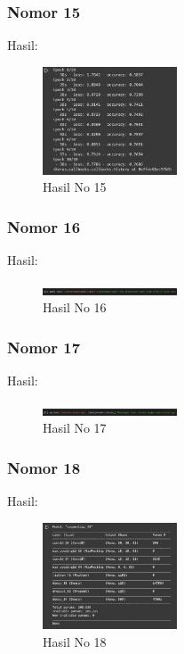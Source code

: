 \subsubsection{Nomor 15}
\hfill\break

Hasil:
\begin{figure}[H]
\centering
	\includegraphics[width=4cm]{figures/1174067/7/no15.jpg}
	\caption{Hasil No 15}
\end{figure}

\subsubsection{Nomor 16}
\hfill\break

Hasil:
\begin{figure}[H]
\centering
	\includegraphics[width=4cm]{figures/1174067/7/no16.jpg}
	\caption{Hasil No 16}
\end{figure}

\subsubsection{Nomor 17}
\hfill\break

Hasil:
\begin{figure}[H]
\centering
	\includegraphics[width=4cm]{figures/1174067/7/no17.jpg}
	\caption{Hasil No 17}
\end{figure}

\subsubsection{Nomor 18}
\hfill\break

Hasil:
\begin{figure}[H]
\centering
	\includegraphics[width=4cm]{figures/1174067/7/no18.jpg}
	\caption{Hasil No 18}
\end{figure}

